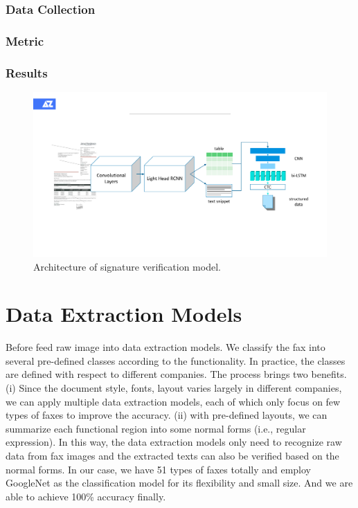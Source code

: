 \documentclass[sigconf]{acmart}
\begin{document}
\subsubsection*{Data Collection}

\subsubsection*{Metric}

\subsubsection*{Results}






\begin{figure}[h]
	\centering
	\includegraphics[width=\linewidth]{figure4}
	\caption{Architecture of signature verification model. }
	\label{figure4}
\end{figure}


\section{Data Extraction Models}
Before feed raw image into data extraction models. We classify the fax into several pre-defined classes according to the functionality. In practice, the classes are defined with respect to different companies. The process brings two benefits. (i) Since the document style, fonts, layout varies largely in different companies, we can apply multiple data extraction models, each of which only focus on few types of faxes to improve the accuracy. (ii) with pre-defined layouts, we can summarize each functional region into some normal forms (i.e., regular expression). In this way, the data extraction models only need to recognize raw data from fax images and the extracted texts can also be verified based on the normal forms. In our case, we have 51 types of faxes totally and employ GoogleNet \cite{szegedy2015going} as the classification model for its flexibility and small size. And we are able to achieve 100\% accuracy finally.
\end{document}
